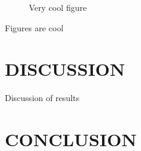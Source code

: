 \documentclass[conference]{ieeeconf}
\begin{document}
   \begin{figure}[thpb]
      \centering
      \caption{Very cool figure}
      \label{figurelabel}
   \end{figure}
   

Figures are cool

\section{DISCUSSION}

Discussion of results 

\section{CONCLUSION}

\addtolength{\textheight}{-12cm}   %












\end{document}
